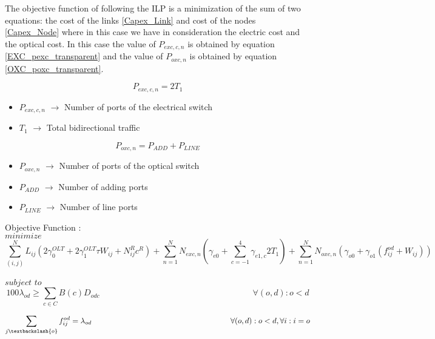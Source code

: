 The objective function of following the ILP is a minimization of the sum of two equations: the cost of the links \ref{Capex_Link} and cost of the nodes \ref{Capex_Node} where in this case we have in consideration the electric cost and the optical cost.
In this case the value of $P_{exc,c,n}$ is obtained by equation \ref{EXC_pexc_transparent} and the value of $P_{oxc,n}$ is obtained by equation \ref{OXC_poxc_transparent}.

\begin{equation}
P_{exc,c,n} = 2 T_1
\label{EXC_pexc_transparent}
\end{equation}

\begin{itemize}
\item{$P_{exc,c,n}$	    $\rightarrow$	Number of ports of the electrical switch}
\item{$T_1$				$\rightarrow$	Total bidirectional traffic}
\end{itemize}
\begin{equation}
P_{oxc,n} = P_{ADD} + P_{LINE}
\label{OXC_poxc_transparent}
\end{equation}
\begin{itemize}
\item{$P_{oxc,n}$	    $\rightarrow$	Number of ports of the optical switch}
\item{$P_{ADD}$			$\rightarrow$	Number of adding ports}
\item{$P_{LINE}$		$\rightarrow$	Number of line ports}
\end{itemize}

Objective Function :\\
$minimize$
\begin{equation}
\sum_{(i,j)}^N L_{ij} (2 \gamma_0^{OLT} + 2 \gamma_1^{OLT} \tau W_{ij} + N^R_{ij} c^R) + \sum_{n=1}^{N} N_{exc,n} (\gamma_{e0} + \sum_{c=-1}^4 \gamma_{e1,c} 2 T_1) + \sum_{n=1}^{N} N_{oxc,n} (\gamma_{o0} + \gamma_{o1}(f_{ij}^{od} + W_{ij}))
\label{ILPTransp_surv}
\end{equation}

$subject$ $to$
\begin{equation}
100 \lambda_{od} \geq \sum_{c\in C} B\left(c\right) D_{odc} \qquad \qquad \qquad \qquad \qquad \qquad \qquad \qquad \qquad
\forall(o,d) : o < d
\label{ILPTransp0_surv}
\end{equation}

\begin{equation}
\sum_{j\textbackslash \{o\}} f_{ij}^{od} = \lambda_{od}  \qquad \qquad \qquad \qquad \qquad \qquad \qquad \qquad \qquad
\forall(o,d) : o < d, \forall i: i = o
\label{ILPTransp1_surv}
\end{equation}

